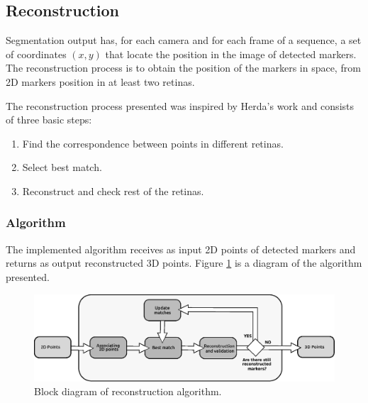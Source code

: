 \subsection{Reconstruction}
Segmentation output has, for each camera and for each frame of a sequence, a set of coordinates $(x, y)$ that locate the position in the image of detected markers.
The reconstruction process is to obtain the position of the markers in space, from 2D markers position in at least two retinas.

The reconstruction process presented was inspired by Herda's work and consists of three basic steps:
\vspace{-0.2cm}
\begin{enumerate}
\item Find the correspondence between points in different retinas.
\item Select best match.
\item Reconstruct and check rest of the retinas.
\end{enumerate}
\vspace{-0.8cm}
\subsubsection{Algorithm}
The implemented algorithm receives as input 2D points of detected markers and returns as output reconstructed 3D points.
Figure \ref{fig: diagrama algoritmo} is a diagram of the algorithm presented.
\begin{figure}
    \begin{center}
        \includegraphics[scale=0.45]{./imagenes/Reconstruccion/bloques_reconstruccion}
        \caption{Block diagram of reconstruction algorithm.}
        \label{fig: diagrama algoritmo}
    \end{center}
\end{figure}

